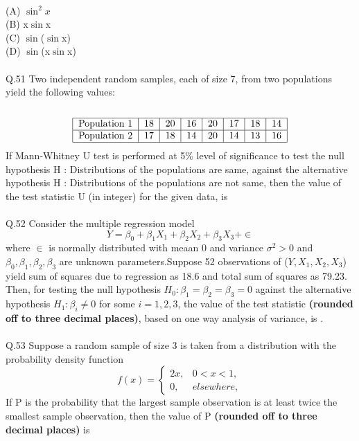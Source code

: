 \documentclass{book}[200pt]
\begin{document}
\\
(A) $\sin^2x$\\
(B) x$\sin$x\\
(C) $\sin$($\sin$x)\\
(D) $\sin$(x$\sin$x)\\
\\
Q.51 Two independent random samples, each of size 7, from two populations yield the
following values:\\
\\

\[\begin{tabular}{|c|c|c|c|c|c|c|c|c|}
	\hline
	Population 1 & 18 & 20 & 16 & 20 & 17 & 18 & 14 \\
	\hline
	Population 2 & 17 & 18 & 14 & 20 & 14 & 13 & 16 \\
	\hline
	
\end{tabular} \]
If Mann-Whitney U test is performed at 5\% level of significance to test the null
hypothesis H : Distributions of the populations are same, against the alternative
hypothesis H : Distributions of the populations are not same, then the value of the
test statistic U (in integer) for the given data, is \underline{\hspace{2cm}} \\
\\
Q.52 Consider the multiple regression model\[
Y = \beta_0 + \beta_1X_1
 + \beta_2X_2 + \beta_3X_3 + \in 
 \]
where $\in$ is normally distributed with meaan 0 and variance $\sigma^2 > 0$ and $\beta_0,\beta_1,\beta_2,\beta_3$ are unknown parameters.Suppose 52 observations of ($Y,X_1,X_2,X_3$)
yield sum of squares due to regression as 18.6 and total sum of squares as 79.23.
Then, for testing the null hypothesis $H_0: \beta_1 = \beta_2 = \beta_3 = 0$ against the alternative hypothesis $H_1: \beta_i \neq 0$ for some $i = 1, 2, 3$, the value of the test statistic \textbf{(rounded off to three decimal places)}, based on one way analysis of variance, is \underline{\hspace{2cm}}.
\\
\\
Q.53 Suppose a random sample of size 3 is taken from a distribution with the probability density function \[
f(x) = \begin{cases}
	2x, & 0 < x < 1, \\
	0, & elsewhere,
\end{cases}
\]
If P is the probability that the largest sample observation is at least twice the smallest sample observation, then the value of P \textbf{(rounded off to three decimal places)} is \underline{\hspace{2cm}}
\end{document}
